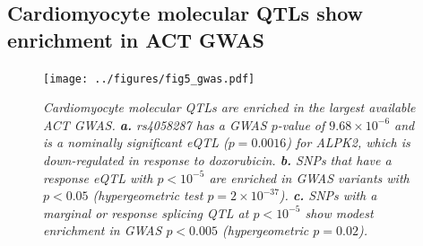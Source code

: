 \documentclass{article}
\begin{document}
\subsection*{Cardiomyocyte molecular QTLs show enrichment in ACT GWAS} 

\begin{figure}
\begin{center}
    \texttt{[image: ../figures/fig5\_gwas.pdf]}     \caption{\it{Cardiomyocyte molecular QTLs are enriched in the largest available ACT GWAS\cite{Schneider2016}. \textbf{a.} rs4058287 has a GWAS $p$-value of $9.68\times 10^{-6}$ and is a nominally significant eQTL ($p=0.0016$) for \emph{ALPK2}, which is down-regulated in response to doxorubicin. \textbf{b.} SNPs that have a response eQTL with $p<10^{-5}$ are enriched in GWAS variants with $p<0.05$ (hypergeometric test $p=2 \times 10^{-37}$). \textbf{c.} SNPs with a marginal or response splicing QTL at $p<10^{-5}$ show modest enrichment in GWAS $p<0.005$ (hypergeometric $p=0.02$).}}
    \label{fig:gwas}
    \end{center}
\end{figure}

\end{document}
